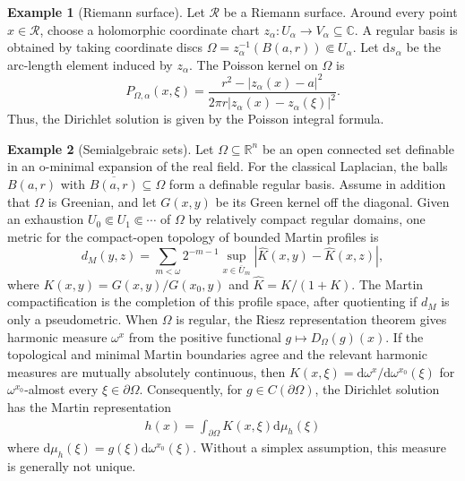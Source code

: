 \documentclass{amsart}
\theoremstyle{definition}
\newtheorem{example}{Example}[section]
\theoremstyle{remark}
\numberwithin{equation}{section}
\begin{document}
	
	\begin{example}[Riemann surface]
		Let $\mathcal R$ be a Riemann surface. Around every point $x\in\mathcal R$, choose a
		holomorphic coordinate chart
		$z_\alpha:U_\alpha\to V_\alpha\subseteq\mathbb C$.
		A regular basis is obtained by taking coordinate discs
		$\Omega=z_\alpha^{-1}(B(a,r))\Subset U_\alpha$.
		Let $\mathrm{d}s_\alpha$ be the arc-length element induced by $z_\alpha$. The Poisson kernel on $\Omega$ is
		$$P_{\Omega,\alpha}(x,\xi)
		=
		\frac{r^2-|z_\alpha(x)-a|^2}
		{2\pi r|z_\alpha(x)-z_\alpha(\xi)|^2}.$$
		Thus, %
		the Dirichlet solution is given by the Poisson integral formula.
	\end{example}
	
	\begin{example}[Semialgebraic sets]
		Let $\Omega\subseteq\mathbb R^n$ be an open connected set definable in an o-minimal expansion of the real field. For the classical Laplacian, the balls $B(a,r)$ with $\overline{B(a,r)}\subseteq\Omega$ form a definable regular basis. Assume in addition that $\Omega$ is Greenian, and let $G(x,y)$ be its Green kernel off the diagonal. Given an exhaustion $U_0\Subset U_1\Subset\cdots$ of $\Omega$ by relatively compact regular domains, one metric for the compact-open topology of bounded Martin profiles is
		$$d_M(y,z)=\sum_{m<\omega}2^{-m-1}\sup_{x\in\overline U_m}|\widehat K(x,y)-\widehat K(x,z)|,$$
		where $K(x,y)=G(x,y)/G(x_0,y)$ and $\widehat K=K/(1+K)$. The Martin compactification is the completion of this profile space, after quotienting if $d_M$ is only a pseudometric. When $\Omega$ is regular, the Riesz representation theorem gives harmonic measure $\omega^x$ from the positive functional $g\mapsto D_\Omega(g)(x)$. If the topological and minimal Martin boundaries agree and the relevant harmonic measures are mutually absolutely continuous, then $K(x,\xi)=\mathrm{d}\omega^x/\mathrm{d}\omega^{x_0}(\xi)$ for $\omega^{x_0}$-almost every $\xi\in\partial\Omega$. Consequently, for $g\in C(\partial\Omega)$, the Dirichlet solution has the Martin representation
		$$
		\begin{aligned}
			h(x)
			=
			\int_{\partial\Omega}K(x,\xi)\mathrm{d}\mu_h(\xi)
		\end{aligned}
		$$
		where $\mathrm{d}\mu_h(\xi)=g(\xi)\mathrm{d}\omega^{x_0}(\xi)$. Without a simplex assumption, this measure is generally not unique.
	\end{example}
	
\end{document}
